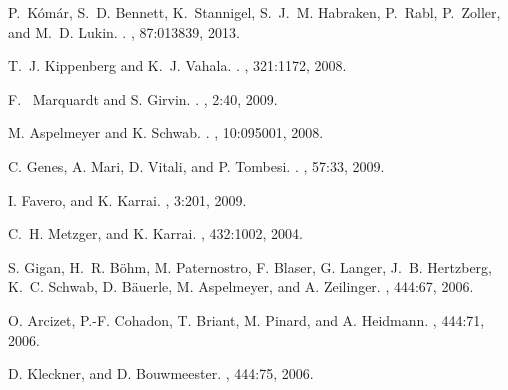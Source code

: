 
%   
% 

 
\ssp %
\begin{thebibliography}{1}


P.~K\'{o}m\'{a}r, 
S.~D. Bennett, 
K.~Stannigel, 
S.~J.~M. Habraken, 
P.~Rabl,
P.~Zoller, 
and M.~D. Lukin.
.
,
87:013839, 2013.

%
T.~J. Kippenberg
and K.~J. Vahala.
.
,
321:1172, 2008.

%
F.~ Marquardt
and S. Girvin.
.
,
2:40, 2009.

%
M. Aspelmeyer
and K. Schwab.
.
,
10:095001, 2008.

%
C. Genes,
A. Mari,
D. Vitali,
and P. Tombesi.
.
,
57:33, 2009.

I. Favero,
and K. Karrai.
,
3:201, 2009.

C.~H. Metzger,
and K. Karrai.
,
432:1002, 2004.

S. Gigan,
H.~R. B\"{o}hm,
M. Paternostro,
F. Blaser,
G. Langer,
J.~B. Hertzberg,
K.~C. Schwab,
D. B\"{a}uerle,
M. Aspelmeyer,
and A. Zeilinger.
,
444:67, 2006.

O. Arcizet,
P.-F. Cohadon,
T. Briant,
M. Pinard,
and A. Heidmann.
,
444:71, 2006.

D. Kleckner,
and D. Bouwmeester.
,
444:75, 2006.


\end{thebibliography}
